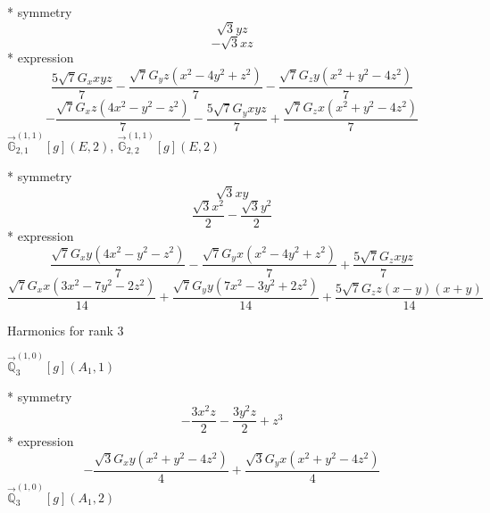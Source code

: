 \documentclass[fleqn,8pt]{jsarticle}
\begin{document}
\noindent\quad ** symmetry
\begin{dmath*}
\sqrt{3} y z
\end{dmath*}
\begin{dmath*}
- \sqrt{3} x z
\end{dmath*}
\noindent\quad ** expression
\begin{dmath*}
\frac{5 \sqrt{7} G_{x} x y z}{7} - \frac{\sqrt{7} G_{y} z \left(x^{2} - 4 y^{2} + z^{2}\right)}{7} - \frac{\sqrt{7} G_{z} y \left(x^{2} + y^{2} - 4 z^{2}\right)}{7}
\end{dmath*}
\begin{dmath*}
- \frac{\sqrt{7} G_{x} z \left(4 x^{2} - y^{2} - z^{2}\right)}{7} - \frac{5 \sqrt{7} G_{y} x y z}{7} + \frac{\sqrt{7} G_{z} x \left(x^{2} + y^{2} - 4 z^{2}\right)}{7}
\end{dmath*}
\noindent\quad $\vec{\mathbb{G}}_{2,1}^{(1,1)}[g](E,2)$, $\vec{\mathbb{G}}_{2,2}^{(1,1)}[g](E,2)$

\noindent\quad ** symmetry
\begin{dmath*}
\sqrt{3} x y
\end{dmath*}
\begin{dmath*}
\frac{\sqrt{3} x^{2}}{2} - \frac{\sqrt{3} y^{2}}{2}
\end{dmath*}
\noindent\quad ** expression
\begin{dmath*}
\frac{\sqrt{7} G_{x} y \left(4 x^{2} - y^{2} - z^{2}\right)}{7} - \frac{\sqrt{7} G_{y} x \left(x^{2} - 4 y^{2} + z^{2}\right)}{7} + \frac{5 \sqrt{7} G_{z} x y z}{7}
\end{dmath*}
\begin{dmath*}
\frac{\sqrt{7} G_{x} x \left(3 x^{2} - 7 y^{2} - 2 z^{2}\right)}{14} + \frac{\sqrt{7} G_{y} y \left(7 x^{2} - 3 y^{2} + 2 z^{2}\right)}{14} + \frac{5 \sqrt{7} G_{z} z \left(x - y\right) \left(x + y\right)}{14}
\end{dmath*}

\noindent * Harmonics for rank 3

\noindent\quad $\vec{\mathbb{Q}}_{3}^{(1,0)}[g](A_{1},1)$

\noindent\quad ** symmetry
\begin{dmath*}
- \frac{3 x^{2} z}{2} - \frac{3 y^{2} z}{2} + z^{3}
\end{dmath*}
\noindent\quad ** expression
\begin{dmath*}
- \frac{\sqrt{3} G_{x} y \left(x^{2} + y^{2} - 4 z^{2}\right)}{4} + \frac{\sqrt{3} G_{y} x \left(x^{2} + y^{2} - 4 z^{2}\right)}{4}
\end{dmath*}
\noindent\quad $\vec{\mathbb{Q}}_{3}^{(1,0)}[g](A_{1},2)$
\end{document}
